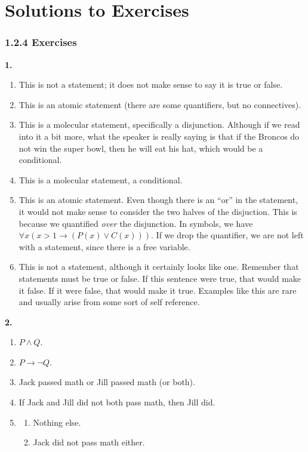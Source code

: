 \documentclass[10pt,]{book}
\theoremstyle{plain}
\theoremstyle{definition}
\theoremstyle{definition}
\theoremstyle{definition}
\numberwithin{equation}{chapter}
\def\imp{\rightarrow}
\begin{document}
\chapter[Solutions to Exercises]{Solutions to Exercises}\label{appendix-1}
\subsection*{1.2.4 Exercises}
\noindent\textbf{1.}\quad{}\leavevmode%
\begin{enumerate}[label=(\alph*)]
\item\hypertarget{li-67}{}This is not a statement; it does not make sense to say it is true or false.%
\item\hypertarget{li-68}{}This is an atomic statement (there are some quantifiers, but no connectives).%
\item\hypertarget{li-69}{}This is a molecular statement, specifically a disjunction.  Although if we read into it a bit more, what the speaker is really saying is that if the Broncos do not win the super bowl, then he will eat his hat, which would be a conditional.%
\item\hypertarget{li-70}{}This is a molecular statement, a conditional.%
\item\hypertarget{li-71}{}This is an atomic statement.  Even though there is an ``or'' in the statement, it would not make sense to consider the two halves of the disjuction.  This is because we quantified \emph{over} the disjunction.  In symbols, we have \(\forall x (x > 1 \imp (P(x) \vee C(x)))\).  If we drop the quantifier, we are not left with a statement, since there is a free variable.%
\item\hypertarget{li-72}{}This is not a statement, although it certainly looks like one.  Remember that statements must be true or false.  If this sentence were true, that would make it false.  If it were false, that would make it true.  Examples like this are rare and usually arise from some sort of self reference.%
\end{enumerate}
\par\smallskip
\noindent\textbf{2.}\quad{}\leavevmode%
\begin{enumerate}[label=(\alph*)]
\item\hypertarget{li-80}{}\(P \wedge Q\).%
\item\hypertarget{li-81}{}\(P \imp \neg Q\).%
\item\hypertarget{li-82}{}
    Jack passed math or Jill passed math (or both).
\item\hypertarget{li-83}{}
    If Jack and Jill did not both pass math, then Jill did.
\item\hypertarget{li-84}{}
\begin{enumerate}[label=\roman*.]
\item\hypertarget{li-85}{} Nothing else. %
\item\hypertarget{li-86}{} Jack did not pass math either.%
\end{enumerate}

\end{enumerate}
\end{document}
